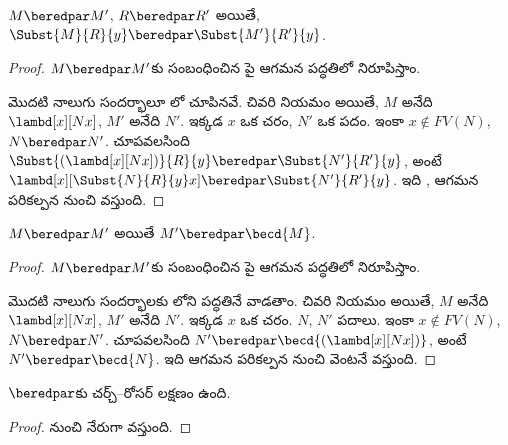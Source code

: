 \documentclass[../../../include/open-logic-section]{subfiles}
\begin{document}
\begin{lem}
  $M \beredpar M'$, $R \beredpar R'$ అయితే,
  $\Subst{M}{R}{y} \beredpar \Subst{M'}{R'}{y}$.
\end{lem}

\begin{proof}
  $M \beredpar M'$కు సంబంధించిన పై
  ఆగమన పద్ధతిలో నిరూపిస్తాం.

  మొదటి నాలుగు సందర్భాలూ లో చూపినవే. చివరి నియమం
   అయితే, $M$ అనేది
  $\lambd[x][Nx]$, $M'$ అనేది $N'$. ఇక్కడ $x$ ఒక చరం,
  $N'$ ఒక పదం. ఇంకా $x \notin FV(N)$, $N \beredpar N'$.
  చూపవలసింది
  $\Subst{(\lambd[x][Nx])}{R}{y} \beredpar
  \Subst{N'}{R'}{y}$, అంటే
  $\lambd[x][\Subst{N}{R}{y} x] \beredpar \Subst{N'}{R'}{y}$.
  ఇది ,
  ఆగమన పరికల్పన నుంచి వస్తుంది.
\end{proof}

\begin{lem}
  $M \beredpar M'$ అయితే $M' \beredpar \becd{M}$.
\end{lem}

\begin{proof}
  $M \beredpar M'$కు సంబంధించిన పై
  ఆగమన పద్ధతిలో నిరూపిస్తాం.

  మొదటి నాలుగు సందర్భాలకు లోని పద్ధతినే వాడతాం. చివరి నియమం
   అయితే, $M$ అనేది
  $\lambd[x][Nx]$, $M'$ అనేది $N'$. ఇక్కడ
  $x$ ఒక చరం. $N$, $N'$ పదాలు. ఇంకా
  $x \notin FV(N)$, $N \beredpar N'$. చూపవలసింది $N' \beredpar
  \becd{(\lambd[x][Nx])}$, అంటే $N' \beredpar \becd{N}$.
  ఇది ఆగమన పరికల్పన నుంచి వెంటనే వస్తుంది.
\end{proof}

\begin{thm}
  $\beredpar$కు చర్చ్--రోసర్ లక్షణం ఉంది.
\end{thm}

\begin{proof}
   నుంచి నేరుగా వస్తుంది.
\end{proof}
\end{document}
